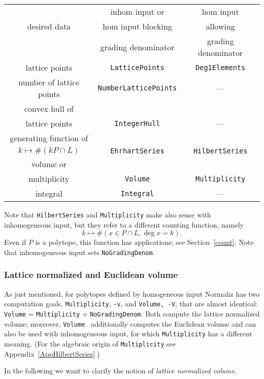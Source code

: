 \documentclass[12pt,a4paper]{scrartcl}
\theoremstyle{definition}
\begin{document}
\begin{center}
	\begin{tabular}[pos]{|c|c|c|}
		\hline
		& inhom input or& hom input\\
		desired data & hom input blocking & allowing\\
		&grading denominator& grading denominator\\
		\hline\hline
		lattice points &\verb|LatticePoints|&\verb|Deg1Elements|\\
		\hline
		number of lattice points& \verb|NumberLatticePoints|& ---\\
		\hline
		convex hull of&&\\
		lattice points& \verb|IntegerHull|& ---\\
		\hline
		generating function of&&\\
		$k\mapsto \#(kP\cap L) $&\verb|EhrhartSeries|&\verb|HilbertSeries|\\
		\hline
		volume or&&\\
		multiplicity& \verb|Volume|&\verb|Multiplicity|\\
		\hline
		integral&\verb|Integral|&---\\
		\hline
	\end{tabular}
\end{center}

Note that \verb|HilbertSeries| and \verb|Multiplicity| make also sense with inhomogeneous input, but they refer to a different counting function, namely
$$
k\mapsto \#(x\in P\cap L, \deg x=k).
$$
Even if $P$ is a polytope, this function has applications; see Section~\ref{count}. Note that inhomogeneous input sets \verb|NoGradingDenom|.

\subsubsection{Lattice normalized and Euclidean volume}\label{volume}

As just mentioned, for polytopes defined by homogeneous input Normaliz has two computation goals, \verb|Multiplicity|, \verb|-v|, and \verb|Volume, -V|, that are almost identical: \verb|Volume| = \verb|Multiplicity| + \verb|NoGradingDenom|. Both compute the lattice normalized volume; moreover, \verb|Volume | additionally computes the Euclidean volume and can also be used with inhomogeneous input, for which \verb|Multiplicity| has a different meaning. (For the algebraic origin of \verb|Multiplicity| see Appendix~\ref{AppHilbertSeries}.)

In the following we want to clarify the notion of \emph{lattice normalized volume}.
\end{document}
